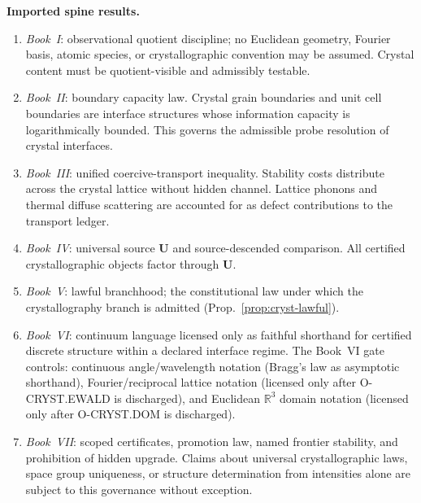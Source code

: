 \documentclass[12pt,oneside]{amsbook}
\theoremstyle{plain}
\theoremstyle{definition}
\theoremstyle{remark}
\begin{document}
\textbf{Imported spine results.}
\begin{enumerate}[label=\textup{(\arabic*)}]
  \item \emph{Book~I}: observational quotient discipline; no Euclidean
    geometry, Fourier basis, atomic species, or crystallographic
    convention may be assumed.  Crystal content must be
    quotient-visible and admissibly testable.
  \item \emph{Book~II}: boundary capacity law.  Crystal grain
    boundaries and unit cell boundaries are interface structures
    whose information capacity is logarithmically bounded.  This
    governs the admissible probe resolution of crystal interfaces.
  \item \emph{Book~III}: unified coercive-transport inequality.
    Stability costs distribute across the crystal lattice without
    hidden channel.  Lattice phonons and thermal diffuse scattering
    are accounted for as defect contributions to the transport
    ledger.
  \item \emph{Book~IV}: universal source $\mathbf{U}$ and
    source-descended comparison.  All certified crystallographic
    objects factor through $\mathbf{U}$.
  \item \emph{Book~V}: lawful branchhood; the constitutional law
    under which the crystallography branch is admitted
    (Prop.~\ref{prop:cryst-lawful}).
  \item \emph{Book~VI}: continuum language licensed only as faithful
    shorthand for certified discrete structure within a declared
    interface regime.  The Book~VI gate controls:
    continuous angle/wavelength notation (Bragg's law as
    asymptotic shorthand), Fourier/reciprocal lattice notation
    (licensed only after O-CRYST.EWALD is discharged), and
    Euclidean $\mathbb{R}^3$ domain notation (licensed only after
    O-CRYST.DOM is discharged).
  \item \emph{Book~VII}: scoped certificates, promotion law, named
    frontier stability, and prohibition of hidden upgrade.  Claims
    about universal crystallographic laws, space group uniqueness,
    or structure determination from intensities alone are subject to
    this governance without exception.
\end{enumerate}
\end{document}
